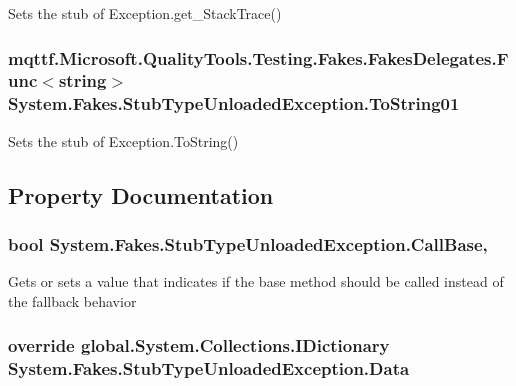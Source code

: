 Sets the stub of Exception.\-get\-\_\-\-Stack\-Trace()

\hypertarget{class_system_1_1_fakes_1_1_stub_type_unloaded_exception_a4aaaa09e2e48ddd68c579873e44ed6e1}{
\subsubsection[{To\-String01}]{\setlength{\rightskip}{0pt plus 5cm}mqttf.\-Microsoft.\-Quality\-Tools.\-Testing.\-Fakes.\-Fakes\-Delegates.\-Func$<$string$>$ System.\-Fakes.\-Stub\-Type\-Unloaded\-Exception.\-To\-String01}}\label{class_system_1_1_fakes_1_1_stub_type_unloaded_exception_a4aaaa09e2e48ddd68c579873e44ed6e1}


Sets the stub of Exception.\-To\-String()



\subsection{Property Documentation}
\hypertarget{class_system_1_1_fakes_1_1_stub_type_unloaded_exception_a899fcf775a032a778ddcfa52120460ae}{
\subsubsection[{Call\-Base}]{\setlength{\rightskip}{0pt plus 5cm}bool System.\-Fakes.\-Stub\-Type\-Unloaded\-Exception.\-Call\-Base\hspace{0.3cm}{\ttfamily [get]}, {\ttfamily [set]}}}\label{class_system_1_1_fakes_1_1_stub_type_unloaded_exception_a899fcf775a032a778ddcfa52120460ae}


Gets or sets a value that indicates if the base method should be called instead of the fallback behavior

\hypertarget{class_system_1_1_fakes_1_1_stub_type_unloaded_exception_a85040536f389b8304635e9f49e19e5ea}{
\subsubsection[{Data}]{\setlength{\rightskip}{0pt plus 5cm}override global.\-System.\-Collections.\-I\-Dictionary System.\-Fakes.\-Stub\-Type\-Unloaded\-Exception.\-Data\hspace{0.3cm}{\ttfamily [get]}}}\label{class_system_1_1_fakes_1_1_stub_type_unloaded_exception_a85040536f389b8304635e9f49e19e5ea}


